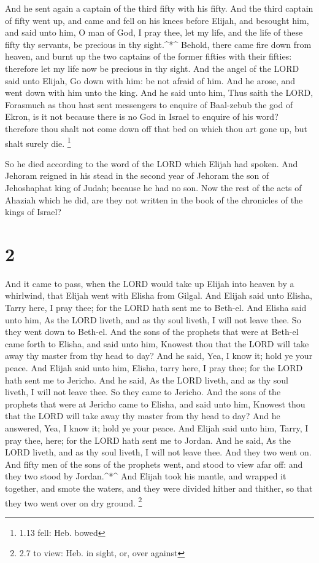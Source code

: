  And he sent again a captain of the third fifty with his
fifty. And the third captain of fifty went up, and came and fell on his
knees before Elijah, and besought him, and said unto him, O man of God,
I pray thee, let my life, and the life of these fifty thy servants, be
precious in thy sight.\^{}*\^{}  Behold, there came fire
down from heaven, and burnt up the two captains of the former fifties
with their fifties: therefore let my life now be precious in thy sight.
 And the angel of the LORD said unto Elijah, Go down with
him: be not afraid of him. And he arose, and went down with him unto the
king.  And he said unto him, Thus saith the LORD, Forasmuch
as thou hast sent messengers to enquire of Baal-zebub the god of Ekron,
is it not because there is no God in Israel to enquire of his word?
therefore thou shalt not come down off that bed on which thou art gone
up, but shalt surely die. \footnote{1.13 fell: Heb. bowed}

 So he died according to the word of the LORD which Elijah
had spoken. And Jehoram reigned in his stead in the second year of
Jehoram the son of Jehoshaphat king of Judah; because he had no son.
 Now the rest of the acts of Ahaziah which he did, are they
not written in the book of the chronicles of the kings of Israel?

\hypertarget{section-1}{%
\section{2}\label{section-1}}

 And it came to pass, when the LORD would take up Elijah
into heaven by a whirlwind, that Elijah went with Elisha from Gilgal.
 And Elijah said unto Elisha, Tarry here, I pray thee; for
the LORD hath sent me to Beth-el. And Elisha said unto him, As the LORD
liveth, and as thy soul liveth, I will not leave thee. So they went down
to Beth-el.  And the sons of the prophets that were at
Beth-el came forth to Elisha, and said unto him, Knowest thou that the
LORD will take away thy master from thy head to day? And he said, Yea, I
know it; hold ye your peace.  And Elijah said unto him,
Elisha, tarry here, I pray thee; for the LORD hath sent me to Jericho.
And he said, As the LORD liveth, and as thy soul liveth, I will not
leave thee. So they came to Jericho.  And the sons of the
prophets that were at Jericho came to Elisha, and said unto him, Knowest
thou that the LORD will take away thy master from thy head to day? And
he answered, Yea, I know it; hold ye your peace.  And Elijah
said unto him, Tarry, I pray thee, here; for the LORD hath sent me to
Jordan. And he said, As the LORD liveth, and as thy soul liveth, I will
not leave thee. And they two went on.  And fifty men of the
sons of the prophets went, and stood to view afar off: and they two
stood by Jordan.\^{}*\^{}  And Elijah took his mantle, and
wrapped it together, and smote the waters, and they were divided hither
and thither, so that they two went over on dry ground. \footnote{2.7 to
  view: Heb. in sight, or, over against}


